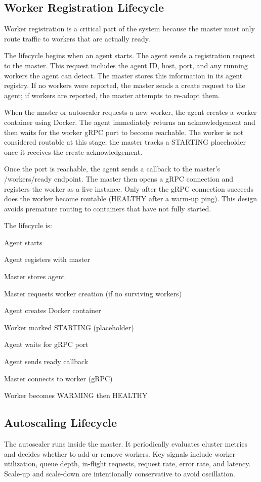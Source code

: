 \subsection{Worker Registration Lifecycle}
Worker registration is a critical part of the system because the master must only route traffic to workers that are actually ready.

The lifecycle begins when an agent starts. The agent sends a registration request to the master. This request includes the agent ID, host, port, and any running workers the agent can detect. The master stores this information in its agent registry. If no workers were reported, the master sends a create request to the agent; if workers are reported, the master attempts to re-adopt them.

When the master or autoscaler requests a new worker, the agent creates a worker container using Docker. The agent immediately returns an acknowledgement and then waits for the worker gRPC port to become reachable. The worker is not considered routable at this stage; the master tracks a STARTING placeholder once it receives the create acknowledgement.

Once the port is reachable, the agent sends a callback to the master's /workers/ready endpoint. The master then opens a gRPC connection and registers the worker as a live instance. Only after the gRPC connection succeeds does the worker become routable (HEALTHY after a warm-up ping). This design avoids premature routing to containers that have not fully started.

The lifecycle is:
\begin{center}
Agent starts

Agent registers with master

Master stores agent

Master requests worker creation (if no surviving workers)

Agent creates Docker container

Worker marked STARTING (placeholder)

Agent waits for gRPC port

Agent sends ready callback

Master connects to worker (gRPC)

Worker becomes WARMING then HEALTHY
\end{center}

\subsection{Autoscaling Lifecycle}
The autoscaler runs inside the master. It periodically evaluates cluster metrics and decides whether to add or remove workers. Key signals include worker utilization, queue depth, in-flight requests, request rate, error rate, and latency. Scale-up and scale-down are intentionally conservative to avoid oscillation.

